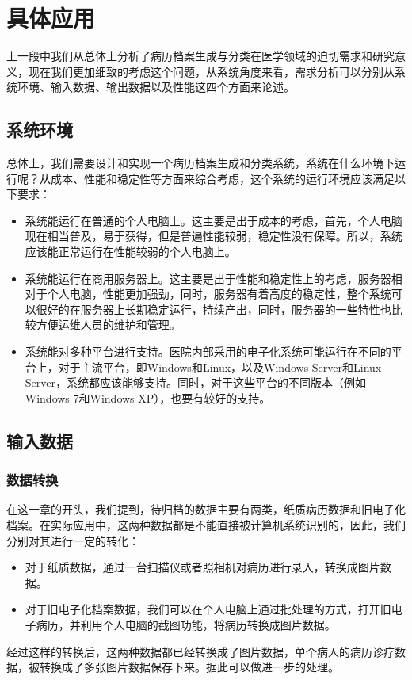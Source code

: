 \section{具体应用}
上一段中我们从总体上分析了病历档案生成与分类在医学领域的迫切需求和研究意义，现在我们更加细致的考虑这个问题，从系统角度来看，需求分析可以分别从系统环境、输入数据、输出数据以及性能这四个方面来论述。

\subsection{系统环境}
总体上，我们需要设计和实现一个病历档案生成和分类系统，系统在什么环境下运行呢？从成本、性能和稳定性等方面来综合考虑，这个系统的运行环境应该满足以下要求：
\begin{itemize}
	\item 系统能运行在普通的个人电脑上。这主要是出于成本的考虑，首先，个人电脑现在相当普及，易于获得，但是普遍性能较弱，稳定性没有保障。所以，系统应该能正常运行在性能较弱的个人电脑上。
	\item 系统能运行在商用服务器上。这主要是出于性能和稳定性上的考虑，服务器相对于个人电脑，性能更加强劲，同时，服务器有着高度的稳定性，整个系统可以很好的在服务器上长期稳定运行，持续产出，同时，服务器的一些特性也比较方便运维人员的维护和管理。
	\item 系统能对多种平台进行支持。医院内部采用的电子化系统可能运行在不同的平台上，对于主流平台，即Windows和Linux，以及Windows Server和Linux Server，系统都应该能够支持。同时，对于这些平台的不同版本（例如Windows 7和Windows XP），也要有较好的支持。
\end{itemize}

\subsection{输入数据}
\subsubsection{数据转换}
在这一章的开头，我们提到，待归档的数据主要有两类，纸质病历数据和旧电子化档案。在实际应用中，这两种数据都是不能直接被计算机系统识别的，因此，我们分别对其进行一定的转化：
\begin{itemize}
	\item 对于纸质数据，通过一台扫描仪或者照相机对病历进行录入，转换成图片数据。
	\item 对于旧电子化档案数据，我们可以在个人电脑上通过批处理的方式，打开旧电子病历，并利用个人电脑的截图功能，将病历转换成图片数据。
\end{itemize}
经过这样的转换后，这两种数据都已经转换成了图片数据，单个病人的病历诊疗数据，被转换成了多张图片数据保存下来。据此可以做进一步的处理。

